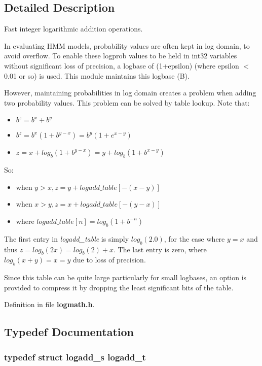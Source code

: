 \subsection{Detailed Description}
Fast integer logarithmic addition operations. 

In evaluating HMM models, probability values are often kept in log domain, to avoid overflow. To enable these logprob values to be held in int32 variables without significant loss of precision, a logbase of (1+epsilon) (where epsilon $<$ 0.01 or so) is used. This module maintains this logbase (B).

However, maintaining probabilities in log domain creates a problem when adding two probability values. This problem can be solved by table lookup. Note that:

\begin{itemize}
\item $ b^z = b^x + b^y $\item $ b^z = b^x(1 + b^{y-x}) = b^y(1 + e^{x-y}) $\item $ z = x + log_b(1 + b^{y-x}) = y + log_b(1 + b^{x-y}) $\end{itemize}


So:

\begin{itemize}
\item when $ y > x, z = y + logadd\_table[-(x-y)] $\item when $ x > y, z = x + logadd\_table[-(y-x)] $\item where $ logadd\_table[n] = log_b(1 + b^{-n}) $\end{itemize}


The first entry in {\em logadd\_\-table\/} is simply $ log_b(2.0) $, for the case where $ y = x $ and thus $ z = log_b(2x) = log_b(2) + x $. The last entry is zero, where $ log_b(x+y) = x = y $ due to loss of precision.

Since this table can be quite large particularly for small logbases, an option is provided to compress it by dropping the least significant bits of the table. 

Definition in file {\bf logmath.h}.

\subsection{Typedef Documentation}
\subsubsection[{logadd\_\-t}]{\setlength{\rightskip}{0pt plus 5cm}typedef struct logadd\_\-s {\bf logadd\_\-t}}\label{logmath_8h_8c04c94e2c6364f6cf3b649eb4ce5bfd}


